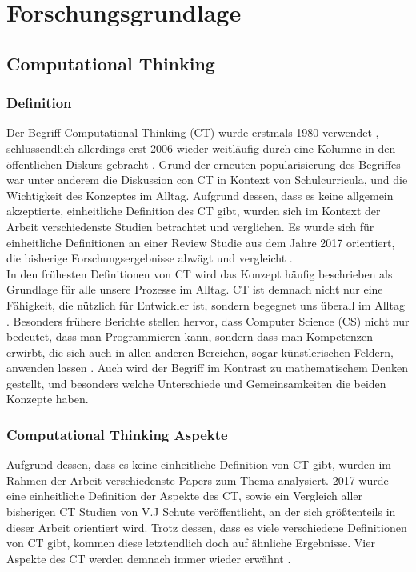 \clearpage
\section{Forschungsgrundlage}
\label{sec:research}

\subsection{Computational Thinking}

\subsubsection{Definition}
Der Begriff Computational Thinking (CT) wurde erstmals 1980 verwendet \cite{papert}, schlussendlich allerdings erst 2006 wieder weitläufig durch eine Kolumne in den öffentlichen Diskurs gebracht \cite{wing2006}.
Grund der erneuten popularisierung des Begriffes war unter anderem die Diskussion con CT in Kontext von Schulcurricula, und die Wichtigkeit des Konzeptes im Alltag.
Aufgrund dessen, dass es keine allgemein akzeptierte, einheitliche Definition des CT gibt, wurden sich im Kontext der Arbeit verschiedenste Studien betrachtet und verglichen. Es wurde sich für einheitliche Definitionen an einer Review Studie aus dem Jahre 2017 orientiert, die bisherige Forschungsergebnisse abwägt und vergleicht \cite{schute}.
\\
In den frühesten Definitionen von CT wird das Konzept häufig beschrieben als Grundlage für alle unsere Prozesse im Alltag. CT ist demnach nicht nur eine Fähigkeit, die nützlich für Entwickler ist, sondern begegnet uns überall im Alltag \cite{khine17}. Besonders frühere Berichte stellen hervor, dass Computer Science (CS) nicht nur bedeutet, dass man Programmieren kann, sondern dass man Kompetenzen erwirbt, die sich auch in allen anderen Bereichen, sogar künstlerischen Feldern, anwenden lassen \cite{wing2006}.
Auch wird der Begriff im Kontrast zu mathematischem Denken gestellt, und besonders welche Unterschiede und Gemeinsamkeiten die beiden Konzepte haben.

\subsubsection{Computational Thinking Aspekte}
Aufgrund dessen, dass es keine einheitliche Definition von CT gibt, wurden im Rahmen der Arbeit verschiedenste Papers zum Thema analysiert. 2017 wurde eine einheitliche Definition der Aspekte des CT, sowie ein Vergleich aller bisherigen CT Studien von V.J Schute \cite{schute} veröffentlicht, an der sich größtenteils in dieser Arbeit orientiert wird.
Trotz dessen, dass es viele verschiedene Definitionen von CT gibt, kommen diese letztendlich doch auf ähnliche Ergebnisse. Vier Aspekte des CT werden demnach immer wieder erwähnt \cite{schute}.

